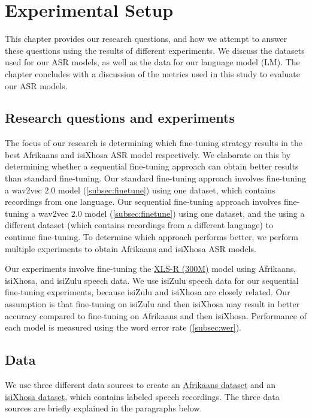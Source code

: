 \graphicspath{{experimental_setup/fig/}}

\chapter{Experimental Setup} \label{chap:experimental_setup}
This chapter provides our research questions, and how we attempt to answer
these questions using the results of different experiments. We discuss the datasets used for
our ASR models, as well as the data for our language model (LM).
The chapter concludes with a discussion of the metrics used in this study to evaluate our ASR models.

\section{Research questions and experiments}
The focus of our research is determining which fine-tuning strategy results in the best Afrikaans and isiXhosa ASR model respectively.
We elaborate on this by determining whether a sequential fine-tuning approach can obtain better results than standard fine-tuning.
Our standard fine-tuning approach involves fine-tuning a wav2vec 2.0 model (\ref{subsec:finetune}) using one dataset, which contains recordings from one language.
Our sequential fine-tuning approach involves fine-tuning a wav2vec 2.0 model (\ref{subsec:finetune}) using one dataset, and the using a different dataset (which contains recordings from a different language)
to continue fine-tuning. To determine which approach performs better, we perform multiple experiments to obtain Afrikaans and isiXhosa ASR models.

Our experiments involve fine-tuning the \href{https://huggingface.co/facebook/wav2vec2-xls-r-300m}{XLS-R (300M)} model using Afrikaans, isiXhosa, and isiZulu speech data.
We use isiZulu speech data for our sequential fine-tuning experiments, because isiZulu and isiXhosa are closely related.
Our assumption is that fine-tuning on isiZulu and then isiXhosa may result in better accuracy compared to fine-tuning on Afrikaans and then isiXhosa.
Performance of each model is measured using the word error rate (\ref{subsec:wer}).

\section{Data}
We use three different data sources to create an \href{https://huggingface.co/datasets/lucas-meyer/asr_af}{Afrikaans dataset} and an \href{https://huggingface.co/datasets/lucas-meyer/asr_xh}{isiXhosa dataset}, which contains labeled speech recordings.
The three data sources are briefly explained in the paragraphs below.

